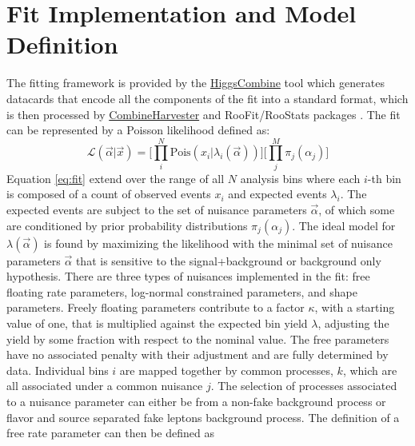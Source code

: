 



\section{Fit Implementation and Model Definition}
The fitting framework is provided by the \url{HiggsCombine} tool which generates datacards that encode all the components of the fit into a standard format, which is then processed by \url{CombineHarvester} and RooFit/RooStats packages \cite{Antcheva:2009zz}\cite{moneta2011roostats}. The fit can be represented by a Poisson likelihood defined as:
\begin{equation}
\label{eq:fit}
\mathcal{L}(\vec{\alpha}|\vec{x}) = \bigg[ \prod_i^N \text{Pois}(x_i|\lambda_i(\vec{\alpha})) \bigg] \bigg[\prod_j^M \pi_j(\alpha_j) \bigg]
\end{equation}
Equation \ref{eq:fit} extend over the range of all $N$ analysis bins where each $i$-th bin is composed of a count of observed events $x_i$ and expected events $\lambda_i$. The expected events are subject to the set of nuisance parameters $\vec{\alpha}$, of which some are conditioned by prior probability distributions $\pi_j(\alpha_j)$. The ideal model for $\lambda(\vec{\alpha})$ is found by maximizing the likelihood with the minimal set of nuisance parameters $\vec{\alpha}$ that is sensitive to the signal+background or background only hypothesis.  There are three types of nuisances implemented in the fit: free floating rate parameters, log-normal constrained parameters, and shape parameters.  Freely floating parameters contribute to a factor $\kappa$, with a starting value of one, that is multiplied against the expected bin yield $\lambda$, adjusting the yield by some fraction with respect to the nominal value. The free parameters have no associated penalty with their adjustment and are fully determined by data. Individual bins $i$ are mapped together by common processes, $k$, which are all associated under a common nuisance $j$. The selection of processes associated to a nuisance parameter can either be  from a non-fake background process or flavor and source separated fake leptons background process. The definition of a free rate parameter can then be defined as 
